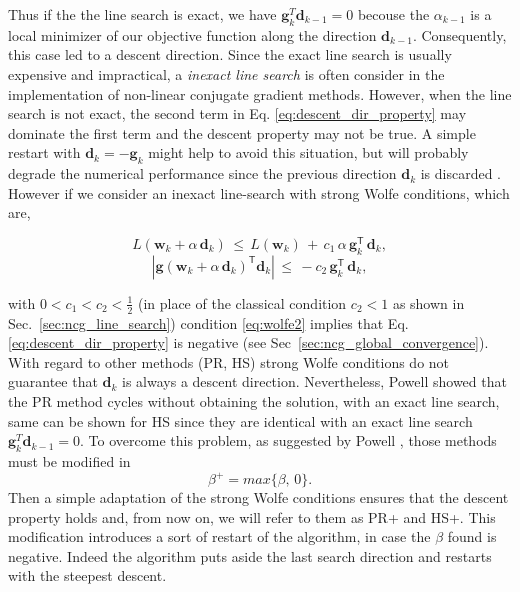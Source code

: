\documentclass[11pt]{article}
\begin{document}
Thus if the the line search is exact, we have $\mathbf{g}^T_k \mathbf{d}_{k-1} = 0$ becouse the $\alpha_{k-1}$ is a local minimizer of our objective function along the direction $\mathbf{d}_{k-1}$. Consequently, this case led to a descent direction. Since the exact line search is usually expensive and impractical, a \emph{inexact line search} is often consider in the implementation of non-linear conjugate gradient methods. However, when the line search is not exact, the second term in Eq. \ref{eq:descent_dir_property} may dominate the first term and the descent property may not be true. A simple restart with $\mathbf{d}_k = -\mathbf{g}_k$ might help to avoid this situation, but will probably degrade the numerical performance since the previous direction $\mathbf{d}_k$ is discarded \cite{Powell1977}. However if we consider an inexact line-search with strong Wolfe conditions, which are,

    \begin{equation}
    \label{eq:wolfe1}
        L(\mathbf{w}_k + \alpha \, \mathbf{d}_k) \, \leq \, L(\mathbf{w}_k)\, + \, c_1 \, \alpha \, \mathbf{g}_k^\mathsf{T} \, \mathbf{d}_k,
    \end{equation}
    \begin{equation}
    \label{eq:wolfe2}
        |\mathbf{g}(\mathbf{w}_k + \alpha \, \mathbf{d}_k)^\mathsf{T} \mathbf{d}_k|\, \leq  \, - c_2 \, \mathbf{g}_k^\mathsf{T} \, \mathbf{d}_k,
    \end{equation}

with $0 < c_1 < c_2 < \frac{1}{2}$ (in place of the classical condition $c_2 < 1$ \cite{Nocedal} as shown in Sec.~\ref{sec:ncg_line_search}) condition \ref{eq:wolfe2} implies that Eq. \ref{eq:descent_dir_property} is negative (see Sec~\ref{sec:ncg_global_convergence}). With regard to other methods (PR, HS) strong Wolfe conditions do not guarantee that $\mathbf{d}_k$ is always a descent direction. Nevertheless, Powell \cite{powell} showed that the PR method cycles without obtaining the solution, with an exact line search, same can be shown for HS since they are identical with an exact line search $\mathbf{g}^T_k \mathbf{d}_{k-1} = 0$.
To overcome this problem, as suggested by Powell \cite{powell}, those methods must be modified in
\begin{equation}
\label{eq:beta_modified}
  \beta^+ = max\{\beta, \, 0\}.  
\end{equation}
Then a simple adaptation of the strong Wolfe conditions ensures that the descent property holds and, from now on, we will refer to them as PR+ and HS+. This modification introduces a sort of restart of the algorithm, in case the $\beta$ found is negative. Indeed the algorithm puts aside the last search direction and restarts with the steepest descent.
\end{document}
